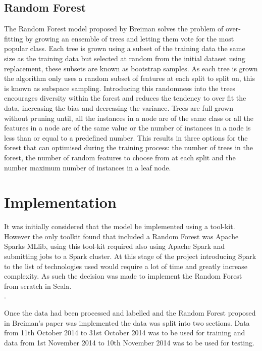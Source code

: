 		\subsection{Random Forest}
			The Random Forest model proposed by Breiman solves the problem of over-fitting by growing an ensemble of trees and letting them vote for the most popular class. Each tree is grown using a subset of the training data the same size as the training data but selected at random from the initial dataset using replacement, these subsets are known as bootstrap samples. As each tree is grown the algorithm only uses a random subset of features at each split to split on, this is known as subspace sampling. Introducing this randomness into the trees encourages diversity within the forest and reduces the tendency to over fit the data, increasing the bias and decreasing the variance. Trees are full grown without pruning until, all the instances in a node are of the same class or all the features in a node are of the same value or the number of instances in a node is less than or equal to a predefined number. This results in three options for the forest that can optimised during the training process: the number of trees in the forest, the number of random features to choose from at each split and the number maximum number of instances in a leaf node.\\					
									
	\section{Implementation}
		It was initially considered that the model be implemented using a tool-kit. However the only toolkit found that included a Random Forest was Apache Sparks MLlib\cite{spark}, using this tool-kit required also using Apache Spark and submitting jobs to a Spark cluster. At this stage of the project introducing Spark to the list of technologies used would require a lot of time and greatly increase complexity. As such the decision was made to implement the Random Forest from scratch in Scala.\\
		
		.		
		
		Once the data had been processed and labelled and the Random Forest proposed in Breiman's paper was implemented the data was split into two sections. Data from 11th October 2014 to 31st October 2014 was to be used for training and data from 1st November 2014 to 10th November 2014 was to be used for testing.\\
		
